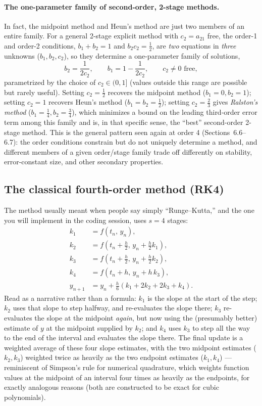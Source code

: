 \paragraph{The one-parameter family of second-order, 2-stage methods.} In fact, the midpoint method and Heun's method are just two members of an entire family. For a general 2-stage explicit method with $c_2 = a_{21}$ free, the order-1 and order-2 conditions, $b_1+b_2=1$ and $b_2 c_2 = \tfrac12$, are \emph{two} equations in \emph{three} unknowns ($b_1,b_2,c_2$), so they determine a one-parameter family of solutions,
\begin{equation}
b_2 = \frac{1}{2c_2}, \qquad b_1 = 1 - \frac{1}{2c_2}, \qquad c_2 \neq 0 \text{ free},
\end{equation}
parametrized by the choice of $c_2 \in (0,1]$ (values outside this range are possible but rarely useful). Setting $c_2 = \tfrac12$ recovers the midpoint method ($b_1=0, b_2=1$); setting $c_2=1$ recovers Heun's method ($b_1=b_2=\tfrac12$); setting $c_2 = \tfrac23$ gives \emph{Ralston's method} ($b_1=\tfrac14, b_2=\tfrac34$), which minimizes a bound on the leading third-order error term among this family and is, in that specific sense, the ``best'' second-order 2-stage method. This is the general pattern seen again at order 4 (Sections~6.6--6.7): the order conditions constrain but do not uniquely determine a method, and different members of a given order/stage family trade off differently on stability, error-constant size, and other secondary properties.

\subsection{The classical fourth-order method (RK4)}

The method usually meant when people say simply ``Runge--Kutta,'' and the one you will implement in the coding session, uses $s=4$ stages:
\begin{align}
k_1 &= f(t_n,\, y_n),\\
k_2 &= f\!\left(t_n+\tfrac{h}{2},\, y_n+\tfrac{h}{2}k_1\right),\\
k_3 &= f\!\left(t_n+\tfrac{h}{2},\, y_n+\tfrac{h}{2}k_2\right),\\
k_4 &= f\!\left(t_n+h,\, y_n+h\,k_3\right),\\
y_{n+1} &= y_n + \frac{h}{6}\left(k_1 + 2k_2 + 2k_3 + k_4\right).
\end{align}
Read as a narrative rather than a formula: $k_1$ is the slope at the start of the step; $k_2$ uses that slope to step halfway, and re-evaluates the slope there; $k_3$ re-evaluates the slope at the midpoint \emph{again}, but now using the (presumably better) estimate of $y$ at the midpoint supplied by $k_2$; and $k_4$ uses $k_3$ to step all the way to the end of the interval and evaluates the slope there. The final update is a weighted average of these four slope estimates, with the two midpoint estimates ($k_2, k_3$) weighted twice as heavily as the two endpoint estimates ($k_1, k_4$) --- reminiscent of Simpson's rule for numerical quadrature, which weights function values at the midpoint of an interval four times as heavily as the endpoints, for exactly analogous reasons (both are constructed to be exact for cubic polynomials).

